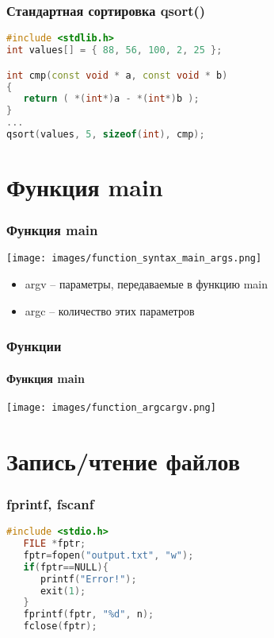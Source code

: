 \documentclass[12pt,pdf,hyperref={unicode}]{beamer}
\begin{document}
\begin{frame}[fragile]
\frametitle{Стандартная сортировка qsort()} 
\begin{lstlisting}[language=C++,basicstyle=\ttfamily,keywordstyle=\color{blue}]
#include <stdlib.h>
int values[] = { 88, 56, 100, 2, 25 };

int cmp(const void * a, const void * b)
{
   return ( *(int*)a - *(int*)b );
}
...
qsort(values, 5, sizeof(int), cmp);

\end{lstlisting}
\end{frame}












\section{Функция main}


\begin{frame}[fragile]
\frametitle{Функция main}  
\begin{center}
\texttt{[image: images/function\_syntax\_main\_args.png]}
\end{center}
\begin{itemize}
\item argv -- параметры, передаваемые в функцию main
\item argc -- количество этих параметров
\end{itemize}
\end{frame}

\begin{frame}[fragile]
\frametitle{Функции} 
\framesubtitle{Функция main}
\begin{center}
\texttt{[image: images/function\_argcargv.png]}
\end{center}
\end{frame}




\section{Запись/чтение файлов}


\begin{frame}[fragile]
\frametitle{fprintf, fscanf}  
\begin{lstlisting}[language=C++,basicstyle=\ttfamily,keywordstyle=\color{blue},
                stringstyle=\color{orange}\ttfamily]
   #include <stdio.h>
   FILE *fptr;
   fptr=fopen("output.txt", "w");
   if(fptr==NULL){
      printf("Error!");   
      exit(1);             
   }
   fprintf(fptr, "%d", n);   
   fclose(fptr);
\end{lstlisting}
\end{frame}
\end{document}
